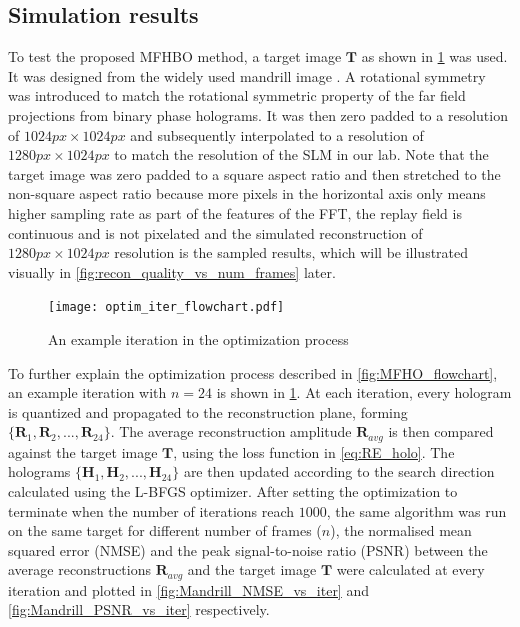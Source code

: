 \subsection{Simulation results}
	To test the proposed MFHBO method, a target image $\textbf{T}$ as shown in \cref{fig:optim_iter_flowchart} was used. It was designed from the widely used mandrill image \cite{MANDRILL_REF}. A rotational symmetry was introduced to match the rotational symmetric property of the far field projections from binary phase holograms. It was then zero padded to a resolution of $1024px\times 1024px$ and subsequently interpolated to a resolution of $1280px\times 1024px$ to match the resolution of the SLM in our lab. Note that the target image was zero padded to a square aspect ratio and then stretched to the non-square aspect ratio because more pixels in the horizontal axis only means higher sampling rate as part of the features of the FFT, the replay field is continuous and is not pixelated and the simulated reconstruction of $1280px\times 1024px$ resolution is the sampled results, which will be illustrated visually in \cref{fig:recon_quality_vs_num_frames} later.
	
	\begin{figure}[h!t]
		\centering
		\texttt{[image: optim\_iter\_flowchart.pdf]}
		\caption{An example iteration in the optimization process}
		\label{fig:optim_iter_flowchart}
	\end{figure}
	
	To further explain the optimization process described in \cref{fig:MFHO_flowchart}, an example iteration with $n=24$ is shown in \cref{fig:optim_iter_flowchart}. At each iteration, every hologram is quantized and propagated to the reconstruction plane, forming $\{\textbf{R}_1, \textbf{R}_2, ..., \textbf{R}_{24}\}$. The average reconstruction amplitude $\textbf{R}_{avg}$ is then compared against the target image $\textbf{T}$, using the loss function in \cref{eq:RE_holo}. The holograms $\{\textbf{H}_1, \textbf{H}_2, ..., \textbf{H}_{24}\}$ are then updated according to the search direction calculated using the L-BFGS optimizer. After setting the optimization to terminate when the number of iterations reach $1000$, the same algorithm was run on the same target for different number of frames ($n$), the normalised mean squared error (NMSE) and the peak signal-to-noise ratio (PSNR) between the average reconstructions $\textbf{R}_{avg}$ and the target image $\textbf{T}$ were calculated at every iteration and plotted in \cref{fig:Mandrill_NMSE_vs_iter} and \cref{fig:Mandrill_PSNR_vs_iter} respectively. 
	
